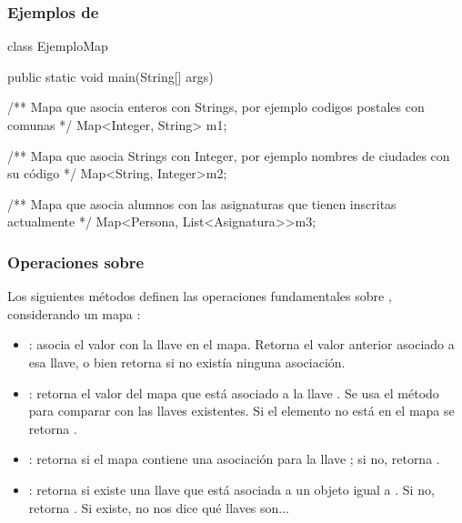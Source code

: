 \documentclass{beamer}
\begin{document}
\begin{frame}[fragile]
  \frametitle{Ejemplos de }

  \begin{jsmall}
    class EjemploMap {
      public static void main(String[] args) {
        /** Mapa que asocia enteros con Strings,
        por ejemplo codigos postales con comunas */        
        Map<Integer, String> m1;

        /** Mapa que asocia Strings con Integer,
        por ejemplo nombres de ciudades con su código */
        Map<String, Integer>m2;

        /** Mapa que asocia alumnos con las asignaturas
        que tienen inscritas actualmente */
        Map<Persona, List<Asignatura>>m3;
      }
    }    
  \end{jsmall}
  
\end{frame}

\begin{frame}
  \frametitle{Operaciones sobre }

  Los siguientes métodos definen las operaciones fundamentales sobre
  , considerando un mapa :

  \begin{itemize}
    
  \item {}: asocia el valor 
    con la llave  en el mapa. Retorna el valor anterior
    asociado a esa llave, o bien retorna  si no existía
    ninguna asociación.
    
  \item {}: retorna el valor del mapa que está
    asociado a la llave . Se usa el método 
    para comparar  con las llaves existentes. Si el
    elemento no está en el mapa se retorna .
    
  \item {}: retorna 
    si el mapa contiene una asociación para la llave ; si
    no, retorna .
    
  \item {}: retorna
     si existe una llave que está asociada a un objeto
    igual a . Si no, retorna . Si existe, no
    nos dice qué llaves son...    
    
  \end{itemize}
  
\end{frame}
\end{document}
